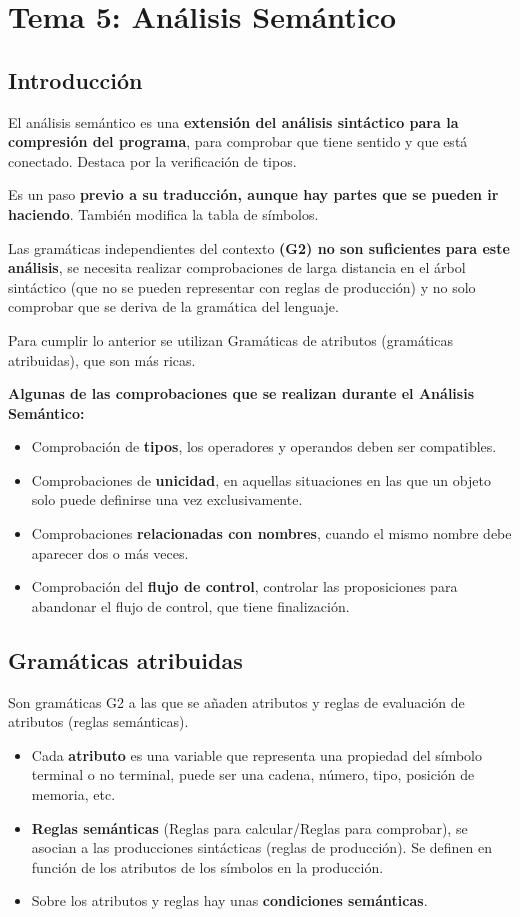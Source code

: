 \documentclass[12pt, twoside, openright]{report} %
\begin{document}
\chapter{Tema 5: Análisis Semántico}

\section{Introducción}
El análisis semántico es una \textbf{extensión del análisis sintáctico para la compresión del programa}, para comprobar que tiene sentido y que está conectado. Destaca por la verificación de tipos.

Es un paso \textbf{previo a su traducción, aunque hay partes que se pueden ir haciendo}. También modifica la tabla de símbolos.

Las gramáticas independientes del contexto \textbf{(G2) no son suficientes para este análisis}, se necesita realizar comprobaciones de larga distancia en el árbol sintáctico (que no se pueden representar con reglas de producción) y no solo comprobar que se deriva de la gramática del lenguaje.

Para cumplir lo anterior se utilizan Gramáticas de atributos (gramáticas atribuidas), que son más ricas.

\textbf{Algunas de las comprobaciones que se realizan durante el Análisis Semántico:}
\begin{itemize}
	\item Comprobación de \textbf{tipos}, los operadores y operandos deben ser compatibles.
	\item Comprobaciones de \textbf{unicidad}, en aquellas situaciones en las que un objeto solo puede definirse una vez exclusivamente.
	\item Comprobaciones \textbf{relacionadas con nombres}, cuando el mismo nombre debe aparecer dos o más veces.
	\item Comprobación del \textbf{flujo de control}, controlar las proposiciones para abandonar el flujo de control, que tiene finalización.
\end{itemize}
\pagebreak
\section{Gramáticas atribuidas}
Son gramáticas G2 a las que se añaden atributos y reglas de evaluación de atributos (reglas semánticas).
\begin{itemize}
	\item Cada \textbf{atributo} es una variable que representa una propiedad del símbolo terminal o no terminal, puede ser una cadena, número, tipo, posición de memoria, etc.
	\item \textbf{Reglas semánticas} (Reglas para calcular/Reglas para comprobar), se asocian a las producciones sintácticas (reglas de producción). Se definen en función de los atributos de los símbolos en la producción.
	\item Sobre los atributos y reglas hay unas \textbf{condiciones semánticas}.
\end{itemize}
\end{document}
